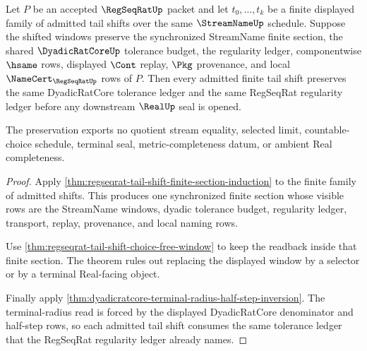 \begin{theorem}
\label{thm:regseqrat-tail-shift-budget-stability}
Let $P$ be an accepted $\RegSeqRatUp$ packet and let $t_0,\ldots,t_k$ be a finite displayed family of admitted tail shifts over the same $\StreamNameUp$ schedule. Suppose the shifted windows preserve the synchronized StreamName finite section, the shared $\DyadicRatCoreUp$ tolerance budget, the regularity ledger, componentwise $\hsame$ rows, displayed $\Cont$ replay, $\Pkg$ provenance, and local $\NameCert_{\RegSeqRatUp}$ rows of $P$. Then every admitted finite tail shift preserves the same DyadicRatCore tolerance ledger and the same RegSeqRat regularity ledger before any downstream $\RealUp$ seal is opened.

The preservation exports no quotient stream equality, selected limit, countable-choice schedule, terminal seal, metric-completeness datum, or ambient Real completeness.
\end{theorem}
\begin{proof}
Apply \autoref{thm:regseqrat-tail-shift-finite-section-induction} to the finite family of admitted shifts. This produces one synchronized finite section whose visible rows are the StreamName windows, dyadic tolerance budget, regularity ledger, transport, replay, provenance, and local naming rows.

Use \autoref{thm:regseqrat-tail-shift-choice-free-window} to keep the readback inside that finite section. The theorem rules out replacing the displayed window by a selector or by a terminal Real-facing object.

Finally apply \autoref{thm:dyadicratcore-terminal-radius-half-step-inversion}. The terminal-radius read is forced by the displayed DyadicRatCore denominator and half-step rows, so each admitted tail shift consumes the same tolerance ledger that the RegSeqRat regularity ledger already names.
\end{proof}
